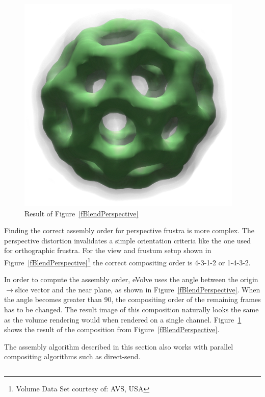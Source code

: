\documentclass[10pt,a4]{scrartcl}
\newcommand{\fig}[1]{Figure~\ref{#1}}
\begin{document}
\begin{figure}
  \includegraphics[width=.382\textwidth]{images/volResult.png}
  {\caption{\small\label{fVolResult}Result of \fig{fBlendPerspective}}}
\end{figure}
Finding the correct assembly order for perspective frustra is more
complex. The perspective distortion invalidates a simple orientation
criteria like the one used for orthographic frustra. For the view and
frustum setup shown in \fig{fBlendPerspective}\footnote{Volume Data Set
  courtesy of: AVS, USA} the correct compositing order is 4-3-1-2 or
1-4-3-2.

In order to compute the assembly order, \textsf{eVolve} uses the angle
between the origin$\rightarrow$slice vector and the near plane, as shown
in \fig{fBlendPerspective}. When the angle becomes greater than
90\textdegree, the compositing order of the remaining frames has to be
changed. The result image of this composition naturally looks the same
as the volume rendering would when rendered on a single
channel. \fig{fVolResult} shows the result of the composition from
\fig{fBlendPerspective}.

The assembly algorithm described in this section also works with parallel
compositing algorithms such as direct-send. 


{\footnotesize\begin{lstlisting}
\end{lstlisting}}
\fi
\end{document}
